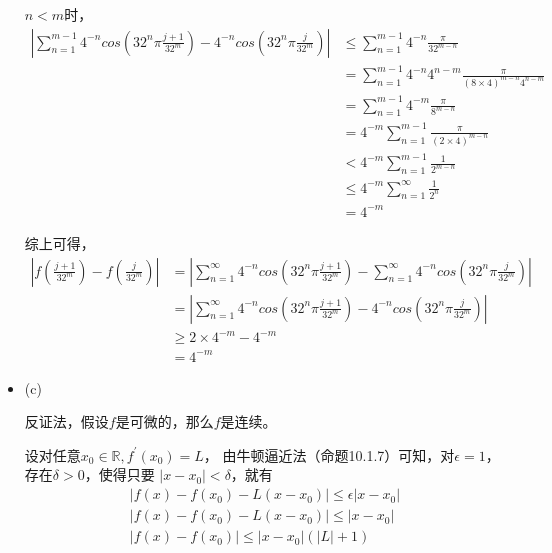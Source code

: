 \documentclass{article}
\begin{document}
\begin{itemize}
        $n < m$时，
        \begin{align*}
          \left|\sum\limits_{n = 1}^{m-1} 4^{-n} cos(32^n \pi \frac{j + 1}{32^m}) - 4^{-n} cos(32^n \pi \frac{j}{32^m}) \right|
           & \leq \sum\limits_{n = 1}^{m-1} 4^{-n}\frac{\pi}{32^{m - n}}                         \\
           & = \sum\limits_{n = 1}^{m-1} 4^{-n}4^{n-m}\frac{\pi}{(8 \times 4)^{m - n} 4^{n - m}} \\
           & = \sum\limits_{n = 1}^{m-1} 4^{-m}\frac{\pi}{8^{m - n}}                             \\
           & = 4^{-m}\sum\limits_{n = 1}^{m-1} \frac{\pi}{(2 \times 4)^{m - n}}                  \\
           & < 4^{-m} \sum\limits_{n = 1}^{m-1} \frac{1}{2^{m - n}}                              \\
           & \leq 4^{-m} \sum\limits_{n = 1}^{\infty} \frac{1}{2^{n}}                            \\
           & = 4^{-m}
        \end{align*}

        综上可得，
        \begin{align*}
          \left|f(\frac{j + 1}{32^m}) - f(\frac{j}{32^m})\right|
           & = \left|\sum\limits_{n = 1}^{\infty} 4^{-n} cos(32^n \pi \frac{j + 1}{32^m}) - \sum\limits_{n = 1}^{\infty} 4^{-n} cos(32^n \pi \frac{j}{32^m}) \right| \\
           & =  \left|\sum\limits_{n = 1}^{\infty} 4^{-n} cos(32^n \pi \frac{j + 1}{32^m}) - 4^{-n} cos(32^n \pi \frac{j}{32^m}) \right|                             \\
           & \geq 2 \times 4^{-m} - 4^{-m}                                                                                                                           \\
           & = 4^{-m}
        \end{align*}
  \item (c)

        反证法，假设$f$是可微的，那么$f$是连续。

        设对任意$x_0 \in \mathbb{R}, f^\prime(x_0) = L$，
        由牛顿逼近法（命题10.1.7）可知，对$\epsilon = 1$，存在$\delta > 0$，使得只要
        $|x - x_0| < \delta$，就有
        \begin{align*}
          |f(x) - f(x_0) - L(x - x_0)| \leq \epsilon |x - x_0| \\
          |f(x) - f(x_0) - L(x - x_0)| \leq |x - x_0|          \\
          |f(x) - f(x_0)| \leq |x - x_0|(|L| + 1)
        \end{align*}


\end{itemize}
\end{document}
